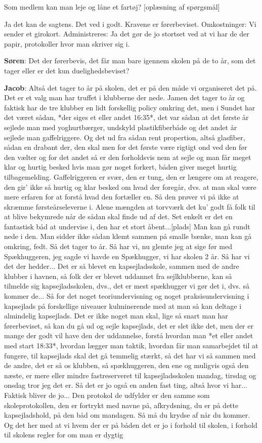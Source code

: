 Som medlem kan man leje og låne et fartøj? [oplæsning af spørgsmål]

Ja det kan de sagtens. Det ved i godt. Kravene er førerbeviset. Omkostninger: Vi sender et girokort. Administreres: Ja det gør de jo stortset ved at vi har de der papir, protokoller hvor man skriver sig i. 

\textbf{Søren}: Det der førerbevis, det får man bare igennem skolen på de to år, som det tager eller er det kun duelighedsbeviset?

\textbf{Jacob}: Altså det tager to år på skolen, det er på den måde vi organiseret det på. Det er et valg man har truffet i klubberne der nede. Jamen det tager to år og faktisk har de tre klubber en lidt forskellig policy omkring det, men i Sundet har det været sådan, *der siges et eller andet 16:35*, det var sådan at det første år sejlede man med yoghurtbærger, undskyld plastikfiberbåde og det andet år sejlede man gaffelriggere. Og det ud fra sådan rent propertion, altså glasfiber, sådan en drabant der, den skal men for det første være rigtigt ond ved den før den vælter og for det andet så er den forholdsvis nem at sejle og man får meget klar og hurtig besked hvis man gør noget forkert, båden giver meget hurtig tilbagemelding. Gaffelriggeren er  svær, den er tung, den er længere om at reagere, den gir' ikke så hurtig og klar besked om hvad der foregår, dvs. at man skal være mere erfaren for at forstå hvad den fortæller en. Så den prøver vi på ikke at skræmme førsteårseleverne i. Alene mængden at torvværk det ku' godt få folk til at blive bekymrede når de sådan skal finde ud af det. Set enkelt er det en fantastisk båd at undervise i, den har et stort åbent...[plads] Man kan gå rundt nede i den. Man sidder ikke sådan klemt sammen på smalle bænke, man kan gå omkring, fedt. Så det tager to år. Så har vi, nu glemte jeg at sige før med Spækhuggeren, jeg sagde vi havde en Spækhugger, vi har skolen 2 år. Så har vi det der hedder... Det er så blevet en kapsejladsskole, sammen med de andre klubber i havnen, så folk der er blevet uddannet fra sejlklubberne, kan så tilmelde sig kapsejladsskolen, dvs., det er mest spækhugger vi gør det i, dvs. så kommer de... Så for det noget teoriundervisning og noget praksisundervisning i kapsejlads på forskellige niveauer kulminerende med at man så kan deltage i almindelig kapsejlads. Det er ikke noget man skal, lige så snart man har førerbeviset, så kan du gå ud og sejle kapsejlads, det er slet ikke det, men der er mange der godt vil have den der uddannelse, forstå hvordan man *et eller andet med start 18:33*, hvordan lægger man taktik, hvordan får man samarbejdet til at fungere, til kapsejlads skal det gå temmelig stærkt, så det har vi så sammen med de andre, det er så os klubben, så spækhuggeren, den ene og muligvis også den næste, er mere eller mindre fastreserveret til kapsejladsskolen mandag, tirsdag og onsdag tror jeg det er. Så det er jo også en anden fast ting, altså hvor vi har... Faktisk bliver de jo... Den protokol de udfylder er den samme som skoleprotokollen, den er fortrykt med navne på, afkrydsning, du er på dette kapsejladshold, på den båd om mandagen. Så må du krydse af når du kommer. Og det her med at vi hvem der er på båden det er jo i forhold til skolen, i forhold til skolens regler for om man er dygtig 